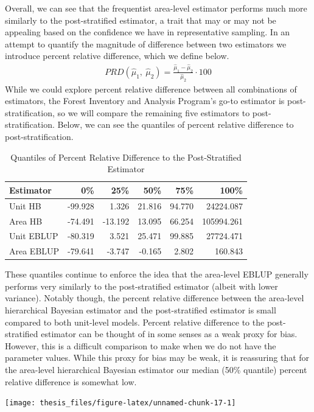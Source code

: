\documentclass[12pt,twoside]{reedthesis}
\begin{document}
Overall, we can see that the frequentist area-level estimator performs much more similarly to the post-stratified estimator, a trait that may or may not be appealing based on the confidence we have in representative sampling. In an attempt to quantify the magnitude of difference between two estimators we introduce percent relative difference, which we define below.
\begin{align*}
PRD(\hat\mu_1,~ \hat\mu_2) = \frac{\hat \mu_1 - \hat\mu_2}{\hat\mu_2} \cdot 100
\end{align*}
While we could explore percent relative difference between all combinations of estimators, the Forest Inventory and Analysis Program's go-to estimator is post-stratification, so we will compare the remaining five estimators to post-stratification. Below, we can see the quantiles of percent relative difference to post-stratification.
\begin{longtable}[t]{lrrrrr}
\caption{\label{tab:unnamed-chunk-16}Quantiles of Percent Relative Difference to the Post-Stratified Estimator}\\
\toprule
Estimator & 0\% & 25\% & 50\% & 75\% & 100\%\\
\midrule
Unit HB & -99.928 & 1.326 & 21.816 & 94.770 & 24224.087\\
Area HB & -74.491 & -13.192 & 13.095 & 66.254 & 105994.261\\
Unit EBLUP & -80.319 & 3.521 & 25.471 & 99.885 & 27724.471\\
Area EBLUP & -79.641 & -3.747 & -0.165 & 2.802 & 160.843\\
\bottomrule
\end{longtable}
These quantiles continue to enforce the idea that the area-level EBLUP generally performs very similarly to the post-stratified estimator (albeit with lower variance). Notably though, the percent relative difference between the area-level hierarchical Bayesian estimator and the post-stratified estimator is small compared to both unit-level models. Percent relative difference to the post-stratified estimator can be thought of in some senses as a weak proxy for bias. However, this is a difficult comparison to make when we do not have the parameter values. While this proxy for bias may be weak, it is reassuring that for the area-level hierarchical Bayesian estimator our median (50\% quantile) percent relative difference is somewhat low.
\begin{center}\texttt{[image: thesis\_files/figure-latex/unnamed-chunk-17-1]} \end{center}
\end{document}
